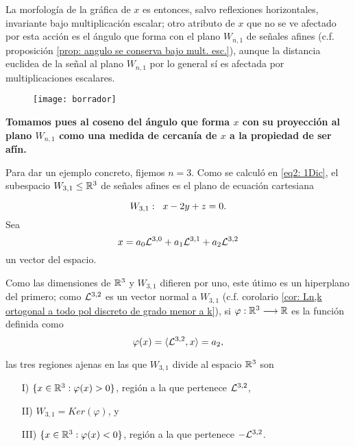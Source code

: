 \begin{ejemplo}
La morfología de la gráfica de $x$ es entonces,
salvo reflexiones horizontales, invariante bajo multiplicación
escalar; otro atributo de $x$ que no se ve afectado por esta acción
es el ángulo que forma con el plano $W_{n,1}$ de señales afines
(c.f. proposición \ref{prop: angulo se conserva bajo mult. esc.}), 
aunque la distancia euclidea de la señal
al plano $W_{n,1}$ por lo general sí es afectada por multiplicaciones escalares.


\begin{figure}[H]
	\centering
	\texttt{[image: borrador]}
\end{figure}

\textbf{Tomamos pues al coseno del ángulo que forma $x$ con su proyección
al plano $W_{n,1}$ como una medida de cercanía de $x$ a la propiedad de 
ser afín.}


Para dar un ejemplo concreto, fijemos $n=3$.
Como se calculó en \eqref{eq2: 1Dic},
el subespacio $W_{3,1} \leq \mathbb{R}^{3}$ de señales afines es el plano
de ecuación cartesiana

\[
W_{3,1}: \hspace{0.2cm} x-2y+z=0.
\]
Sea 
\begin{equation*}
\label{eq0: 9Feb}
x=a_{0}\mathcal{L}^{3,0}+a_{1}\mathcal{L}^{3,1}+a_{2}\mathcal{L}^{3,2}
\end{equation*}
un vector del espacio.


Como las dimensiones de $\mathbb{R}^{3}$ y $W_{3,1}$ 
difieren por uno,
este útimo es un hiperplano
del primero; como $\mathcal{L}^{3,2}$
es un vector normal a $W_{3,1}$
(c.f. corolario \ref{cor: Ln,k ortogonal a todo pol discreto de grado menor a k}), 
si $\varphi: \mathbb{R}^{3} \longrightarrow \mathbb{R}$ es la función
definida como
\begin{equation}
\label{eq: funcion phi ejemplo}
\varphi(x)= \langle \mathcal{L}^{3,2} , x \rangle =a_{2},
\end{equation}



las tres regiones ajenas en las
que $W_{3,1}$ divide al espacio
$\mathbb{R}^{3}$ son 


\begin{itemize}
\item[I)] $\{ x \in \mathbb{R}^{3} : \varphi(x)>0 \}$,
región a la que pertenece $\mathcal{L}^{3,2}$,
\item[II)] $W_{3,1}= Ker(\varphi)$, y 
\item[III)] $\{ x \in \mathbb{R}^{3} : \varphi(x)<0 \}$,
región a la que pertenece $-\mathcal{L}^{3,2}$.
\end{itemize}


\end{ejemplo}
